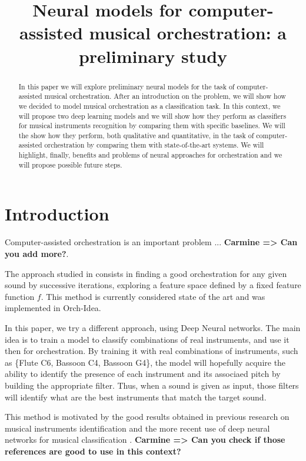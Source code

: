 \documentclass{article}
\title{Neural models for computer-assisted musical orchestration: a preliminary study}
\newcommand{\carmine}[1]{\textbf{\color{red} Carmine => #1}}
\begin{document}
%
\maketitle
%
\begin{abstract}
In this paper we will explore preliminary neural models for the task of computer-assisted musical orchestration. After an introduction on the problem, we will show how we decided to model musical orchestration as a classification task. In this context, we will propose two deep learning models and we will show how they perform as classifiers for musical instruments recognition by comparing them with specific baselines. We will the show how they perform, both qualitative and quantitative, in the task of computer-assisted orchestration by comparing them with state-of-the-art systems. We will highlight, finally, benefits and problems of neural approaches for orchestration and we will propose possible future steps.
\end{abstract}
%
\section{Introduction}\label{sec:introduction}

Computer-assisted orchestration is an important problem ... \carmine{Can you add more?}.

The approach studied in \cite{Cella19} consists in finding a good orchestration for any given sound by successive iterations, exploring a feature space defined by a fixed feature function $f$. This method is currently considered state of the art and was implemented in Orch-Idea.

In this paper, we try a different approach, using Deep Neural networks. The main idea is to train a model to classify combinations of real instruments, and use it then for orchestration. By training it with real combinations of instruments, such as \{Flute C6, Bassoon C4, Bassoon G4\}, the model will hopefully acquire the ability to identify the presence of each instrument and its associaed pitch by building the appropriate filter. Thus, when a sound is given as input, those filters will identify what are the best instruments that match the target sound.

This method is motivated by the good results obtained in previous research on musical instruments identification \cite{Benetos07}\cite{Kitahara05}\cite{Chetry05} and the more recent use of deep neural networks for musical classification \cite{lostanlen16}\cite{Bian}\cite{Brunner}\cite{Defossez19}. \carmine{Can you check if those references are good to use in this context?}
\end{document}
